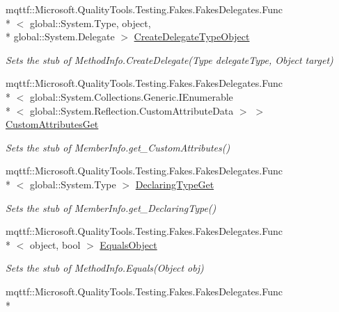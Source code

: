 \begin{DoxyCompactItemize}
mqttf\-::\-Microsoft.\-Quality\-Tools.\-Testing.\-Fakes.\-Fakes\-Delegates.\-Func\\*
$<$ global\-::\-System.\-Type, object, \\*
global\-::\-System.\-Delegate $>$ \hyperlink{class_system_1_1_reflection_1_1_fakes_1_1_stub_method_info_af380bf7f1e98acd7c9b009310c02f58d}{Create\-Delegate\-Type\-Object}
\begin{DoxyCompactList}\small\item\em Sets the stub of Method\-Info.\-Create\-Delegate(\-Type delegate\-Type, Object target)\end{DoxyCompactList}\item 
mqttf\-::\-Microsoft.\-Quality\-Tools.\-Testing.\-Fakes.\-Fakes\-Delegates.\-Func\\*
$<$ global\-::\-System.\-Collections.\-Generic.\-I\-Enumerable\\*
$<$ global\-::\-System.\-Reflection.\-Custom\-Attribute\-Data $>$ $>$ \hyperlink{class_system_1_1_reflection_1_1_fakes_1_1_stub_method_info_aa03074a6b3f656450ad1012c5b9c5094}{Custom\-Attributes\-Get}
\begin{DoxyCompactList}\small\item\em Sets the stub of Member\-Info.\-get\-\_\-\-Custom\-Attributes()\end{DoxyCompactList}\item 
mqttf\-::\-Microsoft.\-Quality\-Tools.\-Testing.\-Fakes.\-Fakes\-Delegates.\-Func\\*
$<$ global\-::\-System.\-Type $>$ \hyperlink{class_system_1_1_reflection_1_1_fakes_1_1_stub_method_info_ab68ab1f424a03a11087ad2d1489f331f}{Declaring\-Type\-Get}
\begin{DoxyCompactList}\small\item\em Sets the stub of Member\-Info.\-get\-\_\-\-Declaring\-Type()\end{DoxyCompactList}\item 
mqttf\-::\-Microsoft.\-Quality\-Tools.\-Testing.\-Fakes.\-Fakes\-Delegates.\-Func\\*
$<$ object, bool $>$ \hyperlink{class_system_1_1_reflection_1_1_fakes_1_1_stub_method_info_a7f042c4aab65ef9ae1822fc14d143f81}{Equals\-Object}
\begin{DoxyCompactList}\small\item\em Sets the stub of Method\-Info.\-Equals(\-Object obj)\end{DoxyCompactList}\item 
mqttf\-::\-Microsoft.\-Quality\-Tools.\-Testing.\-Fakes.\-Fakes\-Delegates.\-Func\\*

\end{DoxyCompactItemize}
